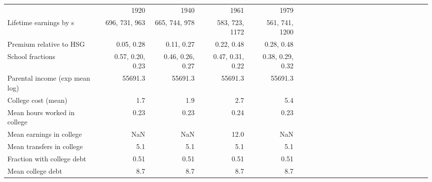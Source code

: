 \begin{tabular}{lrrrrrrrrrrrrrrrrrrrrrrr}
\hline
 & 1920  & 1940  & 1961  & 1979  &   &   &   &   &   &   &   &   &   &   &   &   &   &   &   &   &   &   &   \\
Lifetime earnings by s & 696, 731, 963  & 665, 744, 978  & 583, 723, 1172  & 561, 741, 1200  &   &   &   &   &   &   &   &   &   &   &   &   &   &   &   &   &   &   &   \\
Premium relative to HSG & 0.05, 0.28  & 0.11, 0.27  & 0.22, 0.48  & 0.28, 0.48  &   &   &   &   &   &   &   &   &   &   &   &   &   &   &   &   &   &   &   \\
School fractions & 0.57, 0.20, 0.23  & 0.46, 0.26, 0.27  & 0.47, 0.31, 0.22  & 0.38, 0.29, 0.32  &   &   &   &   &   &   &   &   &   &   &   &   &   &   &   &   &   &   &   \\
Parental income (exp mean log) & 55691.3  & 55691.3  & 55691.3  & 55691.3  &   &   &   &   &   &   &   &   &   &   &   &   &   &   &   &   &   &   &   \\
College cost (mean) & 1.7  & 1.9  & 2.7  & 5.4  &   &   &   &   &   &   &   &   &   &   &   &   &   &   &   &   &   &   &   \\
Mean hours worked in college & 0.23  & 0.23  & 0.24  & 0.23  &   &   &   &   &   &   &   &   &   &   &   &   &   &   &   &   &   &   &   \\
Mean earnings in college & NaN  & NaN  & 12.0  & NaN  &   &   &   &   &   &   &   &   &   &   &   &   &   &   &   &   &   &   &   \\
Mean transfers in college & 5.1  & 5.1  & 5.1  & 5.1  &   &   &   &   &   &   &   &   &   &   &   &   &   &   &   &   &   &   &   \\
Fraction with college debt & 0.51  & 0.51  & 0.51  & 0.51  &   &   &   &   &   &   &   &   &   &   &   &   &   &   &   &   &   &   &   \\
Mean college debt & 8.7  & 8.7  & 8.7  & 8.7  &   &   &   &   &   &   &   &   &   &   &   &   &   &   &   &   &   &   &   \\
\hline
\end{tabular}%
